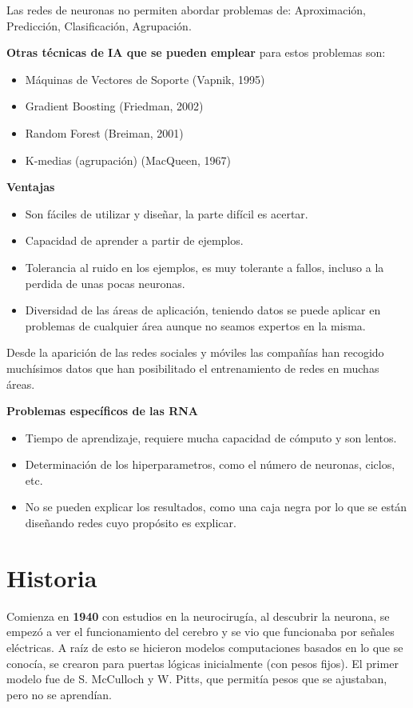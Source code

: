\documentclass[12pt, twoside, openright]{report} %
\begin{document}
Las redes de neuronas no permiten abordar problemas de: Aproximación, Predicción, Clasificación, Agrupación.

\textbf{Otras técnicas de IA que se pueden emplear} para estos problemas son:
\begin{itemize}
	\item Máquinas de Vectores de Soporte (Vapnik, 1995)
	\item Gradient Boosting (Friedman, 2002)
	\item Random Forest (Breiman, 2001)
	\item K-medias (agrupación) (MacQueen, 1967)
\end{itemize}

\textbf{Ventajas}
\begin{itemize}
	\item Son fáciles de utilizar y diseñar, la parte difícil es acertar.
	\item Capacidad de aprender a partir de ejemplos.
	\item Tolerancia al ruido en los ejemplos, es muy tolerante a fallos, incluso a la perdida de unas pocas neuronas.
	\item Diversidad de las áreas de aplicación, teniendo datos se puede aplicar en problemas de cualquier área aunque no seamos expertos en la misma.
\end{itemize}

Desde la aparición de las redes sociales y móviles las compañías han recogido muchísimos datos que han posibilitado el entrenamiento de  redes en muchas áreas.

\textbf{Problemas específicos de las RNA}
\begin{itemize}
	\item Tiempo de aprendizaje, requiere mucha capacidad de cómputo y son lentos.
	\item Determinación de los hiperparametros, como el número de neuronas, ciclos, etc.
	\item No se pueden explicar los resultados, como una caja negra por lo que se están diseñando redes cuyo propósito es explicar.
\end{itemize}

\section{Historia}
Comienza en \textbf{1940} con estudios en la neurocirugía, al descubrir la neurona, se empezó a ver el funcionamiento del cerebro y se vio que funcionaba por señales eléctricas. A raíz de esto se hicieron modelos computaciones basados en lo que se conocía, se crearon para puertas lógicas inicialmente (con pesos fijos). El primer modelo fue de S. McCulloch y W. Pitts, que permitía pesos que se ajustaban, pero no se aprendían.
\end{document}

